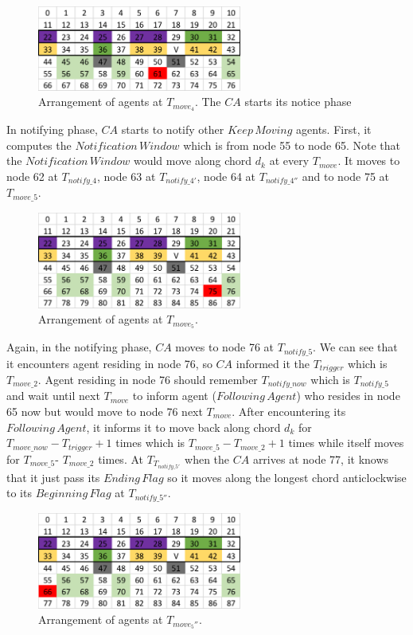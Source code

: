 \begin{figure}[H]
  \centering  
  \includegraphics[width=0.6\textwidth]{figures/T612.png}
  \caption{Arrangement of agents at $T_{move_4}$. The $CA$ starts its notice phase}\label{fig:T612}
\end{figure}
In notifying phase, $CA$ starts to notify other $Keep\,Moving$ agents. First, it computes the $Notification\,Window$ which is from node 55 to node 65. Note that the $Notification\,Window$ would move along chord $d_k$ at every $T_{move}$. It moves to node 62 at $T_{notify\_4}$, node 63 at $T_{notify\_4'}$, node 64 at $T_{notify\_4''}$ and to node 75 at $T_{move\_5}$.

\begin{figure}[H]
  \centering  
  \includegraphics[width=0.6\textwidth]{figures/T75.png}
  \caption{Arrangement of agents at $T_{move_5}$. }\label{fig:T75}
\end{figure}
Again, in the notifying phase, $CA$ moves to node 76 at $T_{notify\_5}$. We can see that it encounters agent residing in node 76, so $CA$ informed it the $T_{trigger}$ which is $T_{move\_2}$. Agent residing in node 76 should remember $T_{notify\_now}$ which is $T_{notify\_5}$ and wait until next $T_{move}$ to inform agent ($Following\,Agent$) who resides in node 65 now but would move to node 76 next $T_{move}$. After encountering its $Following\,Agent$, it informs it to move back along chord $d_k$ for $T_{move\_now}-T_{trigger} +1$ times which is $T_{move\_5}- T_{move\_2}+1$ times while itself moves for $T_{move\_5}$- $T_{move\_2}$ times. 
At $T_{T_{notify\_5'}}$ when the $CA$ arrives at node 77, it knows that it just pass its $Ending\,Flag$ so it moves along the longest chord anticlockwise to its $Beginning\,Flag$ at $T_{notify\_5''}$.
\begin{figure}[H]
  \centering  
  \includegraphics[width=0.6\textwidth]{figures/T66.png}
  \caption{Arrangement of agents at $T_{move_5''}$. }\label{fig:T66}
\end{figure}

